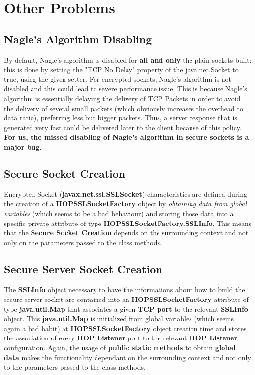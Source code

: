 \section{Other Problems}
%
\subsection{Nagle's Algorithm Disabling}
By default, Nagle's algorithm is disabled for \textbf{all and only} the plain sockets built: this is done by setting the "TCP No Delay" property of the java.net.Socket to true, using the given setter.
For encrypted sockets, Nagle's algorithm is not disabled and this could lead to severe performance issue.
This is because Nagle's algorithm is essentially delaying the delivery of TCP Packets in order to avoid the delivery of several small packets (which obviously increases the overhead to data ratio), preferring less but bigger packets.
Thus, a server response that is generated very fast could be delivered later to the client because of this policy.
\textbf{For us, the missed disabling of Nagle's algorithm in secure sockets is a major bug.}
%
\subsection{Secure Socket Creation}
Encrypted Socket (\textbf{javax.net.ssl.SSLSocket}) characteristics are defined during the creation of a \textbf{IIOPSSLSocketFactory} object by \textit{obtaining data from global variables} (which seems to be a bad behaviour) and storing those data into a specific private attribute of type \textbf{IIOPSSLSocketFactory.SSLInfo}.
This means that the \textbf{Secure Socket Creation} depends on the surrounding context and not only on the parameters passed to the class methods.
%
\subsection{Secure Server Socket Creation}
The \textbf{SSLInfo} object necessary to have the informations about how to build the secure server socket are contained into an \textbf{IIOPSSLSocketFactory} attribute of type \textbf{java.util.Map} that associates a given \textbf{TCP port} to the relevant \textbf{SSLInfo} object.
This \textbf{java.util.Map} is initialized from global variables (which seems again a bad habit) at \textbf{IIOPSSLSocketFactory} object creation time and stores the association of every \textbf{IIOP Listener} port to the relevant \textbf{IIOP Listener} configuration.
Again, the usage of \textbf{public static methods} to obtain \textbf{global data} makes the functionality dependant on the surrounding context and not only to the parameters passed to the class methods.
%
